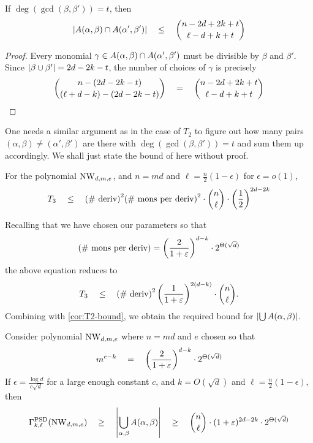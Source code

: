 \begin{observation}\label{obs:T3-proxy}
If $\deg(\gcd(\beta, \beta')) = t$, then
\[
\left|A(\alpha, \beta) \cap A(\alpha', \beta')\right| \quad \leq \quad \binom{n - 2d + 2k + t}{\ell - d + k +t}
\]
\end{observation}
\begin{proof}
Every monomial $\gamma \in A(\alpha, \beta) \cap A(\alpha', \beta')$ must be divisible by $\beta$ and $\beta'$. Since $\left|\beta \cup \beta'\right| = 2d - 2k - t$, the number of choices of $\gamma$ is precisely
\[
\binom{n - (2d - 2k -t)}{(\ell + d - k) - (2d - 2k - t)} \quad = \quad \binom{n - 2d + 2k + t}{\ell - d + k + t}\qedhere
\]
\end{proof}

One needs a similar argument as in the case of $T_2$ to figure out how many pairs $(\alpha, \beta) \neq (\alpha',\beta')$ are there with $\deg(\gcd(\beta, \beta')) = t$ and sum them up accordingly. We shall just state the bound of \cite{KS14} here without proof. 

\begin{lemma}[\cite{KS14}] \label{lem:T3-bound}
For the polynomial $\mathrm{NW}_{d,m,e}$, and $n = md$ and $\ell = \frac{n}{2}(1 - \epsilon)$ for $\epsilon = o(1)$, 
\[
T_3 \quad \leq \quad \text{(\# deriv)}^2 \text{(\# mons per deriv)}^2 \cdot \binom{n}{\ell}\cdot \left(\frac{1}{2}\right)^{2d - 2k}
\]
\end{lemma}

Recalling that we have chosen our parameters so that 
\[
\text{(\# mons per deriv)} = \left(\frac{2}{1+\varepsilon}\right)^{d-k} \cdot 2^{\Theta(\sqrt{d})}
\]
the above equation reduces to 
\[
T_3 \quad \leq \quad \text{(\# deriv)}^2 \left(\frac{1}{1+\varepsilon}\right)^{2(d-k)} \cdot \binom{n}{\ell}.
\]
Combining with \autoref{cor:T2-bound}, we obtain the required bound for $\left|\bigcup A(\alpha, \beta)\right|$. 

\begin{lemma}
Consider polynomial $\mathrm{NW}_{d,m,e}$ where $n = md$ and $e$ chosen so that
\[m^{e-k} \quad = \quad  \left(\frac{2}{1+\varepsilon}\right)^{d-k} \cdot 2^{\Theta(\sqrt{d})}\]
If $\epsilon = \frac{\log d}{c\sqrt{d}}$ for a large enough constant $c$, and $k = O(\sqrt{d})$ and $\ell = \frac{n}{2}(1 - \epsilon)$, then
\[
\Gamma^{\mathrm{PSD}}_{k,\ell}(\mathrm{NW}_{d,m,e})\quad \geq \quad\left|\bigcup_{\alpha, \beta} A(\alpha, \beta)\right| \quad \geq \quad \binom{n}{\ell} \cdot (1+\varepsilon)^{2d-2k} \cdot 2^{\Theta(\sqrt{d})}
\] 
\end{lemma}

